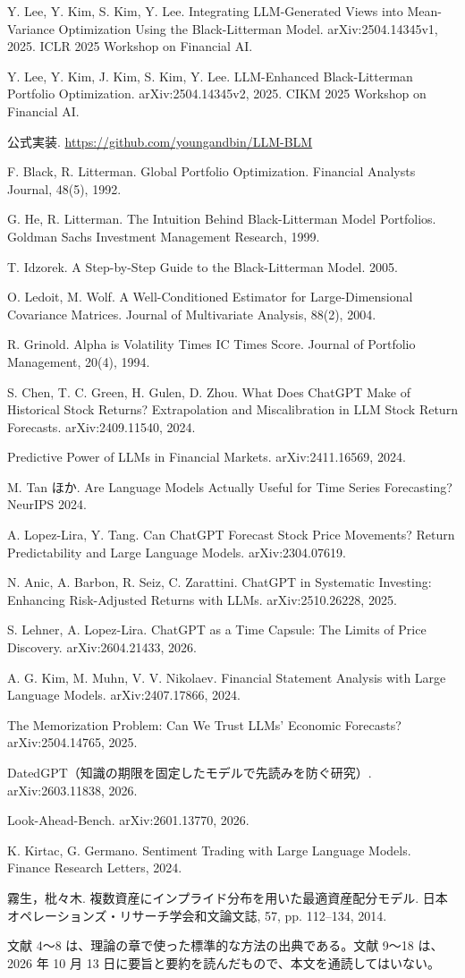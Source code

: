 \documentclass[xelatex,ja=standard,jafont=hiragino-pron,a4paper,10pt]{bxjsreport}
\begin{document}
\begin{enumerate}[label={[\arabic*]},leftmargin=2.4em,itemsep=0.5em]
\item Y. Lee, Y. Kim, S. Kim, Y. Lee. Integrating LLM-Generated Views into Mean-Variance Optimization Using the Black-Litterman Model. arXiv:2504.14345v1, 2025. ICLR 2025 Workshop on Financial AI.
\item Y. Lee, Y. Kim, J. Kim, S. Kim, Y. Lee. LLM-Enhanced Black-Litterman Portfolio Optimization. arXiv:2504.14345v2, 2025. CIKM 2025 Workshop on Financial AI.
\item 公式実装. \url{https://github.com/youngandbin/LLM-BLM}
\item F. Black, R. Litterman. Global Portfolio Optimization. Financial Analysts Journal, 48(5), 1992.
\item G. He, R. Litterman. The Intuition Behind Black-Litterman Model Portfolios. Goldman Sachs Investment Management Research, 1999.
\item T. Idzorek. A Step-by-Step Guide to the Black-Litterman Model. 2005.
\item O. Ledoit, M. Wolf. A Well-Conditioned Estimator for Large-Dimensional Covariance Matrices. Journal of Multivariate Analysis, 88(2), 2004.
\item R. Grinold. Alpha is Volatility Times IC Times Score. Journal of Portfolio Management, 20(4), 1994.
\item S. Chen, T. C. Green, H. Gulen, D. Zhou. What Does ChatGPT Make of Historical Stock Returns? Extrapolation and Miscalibration in LLM Stock Return Forecasts. arXiv:2409.11540, 2024.
\item Predictive Power of LLMs in Financial Markets. arXiv:2411.16569, 2024.
\item M. Tan ほか. Are Language Models Actually Useful for Time Series Forecasting? NeurIPS 2024.
\item A. Lopez-Lira, Y. Tang. Can ChatGPT Forecast Stock Price Movements? Return Predictability and Large Language Models. arXiv:2304.07619.
\item N. Anic, A. Barbon, R. Seiz, C. Zarattini. ChatGPT in Systematic Investing: Enhancing Risk-Adjusted Returns with LLMs. arXiv:2510.26228, 2025.
\item S. Lehner, A. Lopez-Lira. ChatGPT as a Time Capsule: The Limits of Price Discovery. arXiv:2604.21433, 2026.
\item A. G. Kim, M. Muhn, V. V. Nikolaev. Financial Statement Analysis with Large Language Models. arXiv:2407.17866, 2024.
\item The Memorization Problem: Can We Trust LLMs' Economic Forecasts? arXiv:2504.14765, 2025.
\item DatedGPT（知識の期限を固定したモデルで先読みを防ぐ研究）. arXiv:2603.11838, 2026.
\item Look-Ahead-Bench. arXiv:2601.13770, 2026.
\item K. Kirtac, G. Germano. Sentiment Trading with Large Language Models. Finance Research Letters, 2024.
\item 霧生，枇々木. 複数資産にインプライド分布を用いた最適資産配分モデル. 日本オペレーションズ・リサーチ学会和文論文誌, 57, pp. 112--134, 2014.
\end{enumerate}

文献 4〜8 は、理論の章で使った標準的な方法の出典である。文献 9〜18 は、2026 年 10 月 13 日に要旨と要約を読んだもので、本文を通読してはいない。
\end{document}
